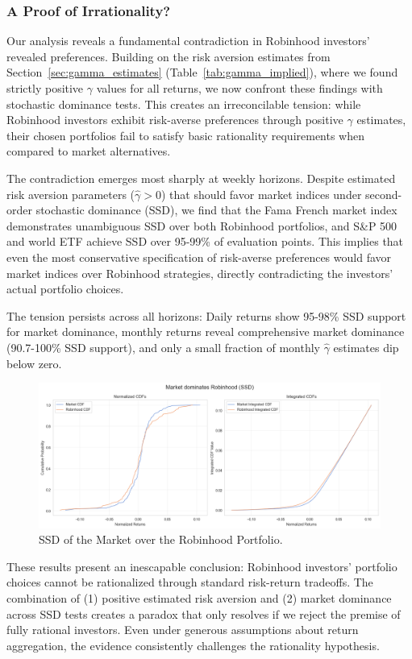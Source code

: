 \subsubsection{A Proof of Irrationality?}
Our analysis reveals a fundamental contradiction in Robinhood investors' revealed preferences. 
Building on the risk aversion estimates from Section~\ref{sec:gamma_estimates} (Table~\ref{tab:gamma_implied}), where we found strictly positive $\gamma$ values for all returns, we now confront these findings with stochastic dominance tests. 
This creates an irreconcilable tension: while Robinhood investors exhibit risk-averse preferences through positive $\gamma$ estimates, their chosen portfolios fail to satisfy basic rationality requirements when compared to market alternatives.

The contradiction emerges most sharply at weekly horizons. 
Despite estimated risk aversion parameters ($\hat{\gamma} > 0$) that should favor market indices under second-order stochastic dominance (SSD), we find that the Fama French market index demonstrates unambiguous SSD over both Robinhood portfolios, 
and S\&P 500 and world ETF  achieve SSD over 95-99\% of evaluation points.
This implies that even the most conservative specification of risk-averse preferences would favor market indices over Robinhood strategies, directly contradicting the investors' actual portfolio choices.

The tension persists across all horizons: Daily returns show 95-98\% SSD support for market dominance, monthly returns reveal comprehensive market dominance (90.7-100\% SSD support), and only a small fraction of monthly $\hat{\gamma}$ estimates dip below zero.

\begin{figure}[H]
    \centering
    \includegraphics[width=0.8\linewidth]{../images/risk/ssd_number_5d_mkt.png}
    \caption{SSD of the Market over the Robinhood Portfolio.}
\label{fig:fsd_fedyk_mine}
\end{figure}    

These results present an inescapable conclusion: Robinhood investors' portfolio choices cannot be rationalized through standard risk-return tradeoffs. 
The combination of (1) positive estimated risk aversion and (2) market dominance across SSD tests creates a paradox that only resolves if we reject the premise of fully rational investors.
Even under generous assumptions about return aggregation, the evidence consistently challenges the rationality hypothesis.

